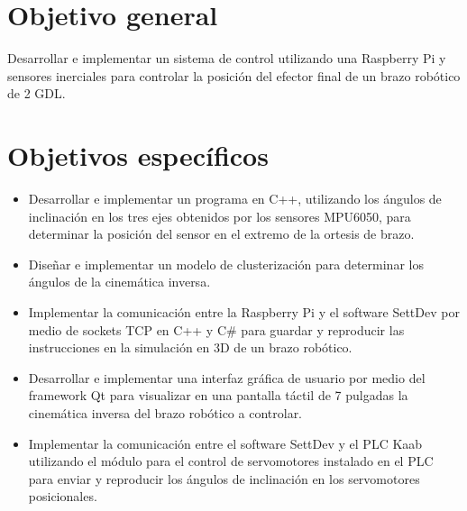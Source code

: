 \section{Objetivo general}

Desarrollar e implementar un sistema de control utilizando una Raspberry Pi y sensores inerciales para controlar la posición del efector final de un brazo robótico de 2 GDL.

\newpage
\section{Objetivos específicos}
\begin{itemize}
	
	\item Desarrollar e implementar un programa en C++, utilizando los ángulos de inclinación en los tres ejes obtenidos por los sensores MPU6050, para determinar la posición del sensor en el extremo de la ortesis de brazo.
	
	\item Diseñar e implementar un modelo de clusterización para determinar los ángulos de la cinemática inversa.
	
	\item Implementar la comunicación entre la Raspberry Pi y el software SettDev por medio de sockets TCP en C++ y C\# para guardar y reproducir las instrucciones en la simulación en 3D de un brazo robótico.
	
	\item Desarrollar e implementar una interfaz gráfica de usuario por medio del framework Qt para visualizar en una pantalla táctil de 7 pulgadas la cinemática inversa del brazo robótico a controlar.
	
	\item Implementar la comunicación entre el software SettDev y el PLC Kaab utilizando el módulo para el control de servomotores instalado en el PLC para enviar y reproducir los ángulos de inclinación en los servomotores posicionales.
	
\end{itemize}